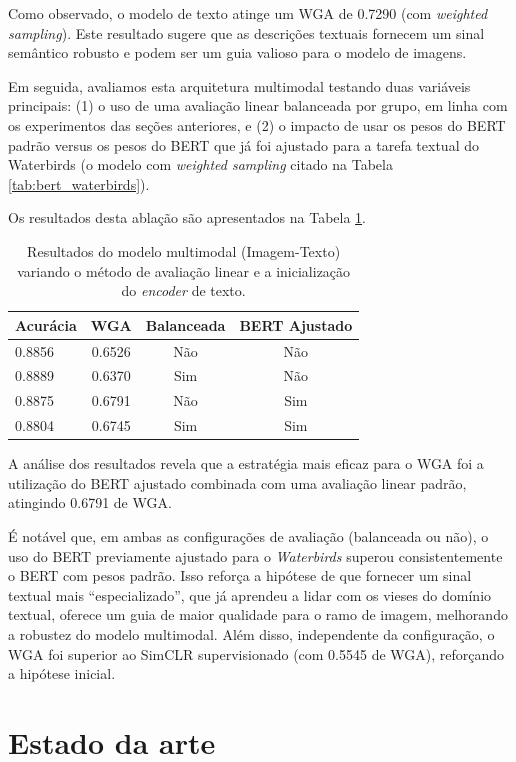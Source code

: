{Como observado, o modelo de texto atinge um WGA de 0.7290 (com \textit{weighted sampling}). Este resultado sugere que as descrições textuais fornecem um sinal semântico robusto e podem ser um guia valioso para o modelo de imagens.

Em seguida, avaliamos esta arquitetura multimodal testando duas variáveis principais: (1) o uso de uma avaliação linear balanceada por grupo, em linha com os experimentos das seções anteriores, e (2) o impacto de usar os pesos do BERT padrão versus os pesos do BERT que já foi ajustado para a tarefa textual do Waterbirds (o modelo com \textit{weighted sampling} citado na Tabela \ref{tab:bert_waterbirds}).

Os resultados desta ablação são apresentados na Tabela \ref{tab:multimodal_results}.

\begin{table}[h]
\centering
\small
\caption{Resultados do modelo multimodal (Imagem-Texto) variando o método de avaliação linear e a inicialização do \textit{encoder} de texto.}
\label{tab:multimodal_results}
\setlength{\tabcolsep}{8pt}
\begin{tabular}{lccc}
\toprule
Acurácia & WGA & Balanceada & BERT Ajustado \\
\midrule
0.8856 & 0.6526 & Não & Não \\
0.8889 & 0.6370 & Sim & Não \\
0.8875 & 0.6791 & Não & Sim \\
0.8804 & 0.6745 & Sim & Sim \\
\bottomrule
\end{tabular}
\end{table}

A análise dos resultados revela que a estratégia mais eficaz para o WGA foi a utilização do BERT ajustado combinada com uma avaliação linear padrão, atingindo 0.6791 de WGA.

É notável que, em ambas as configurações de avaliação (balanceada ou não), o uso do BERT previamente ajustado para o \textit{Waterbirds} superou consistentemente o BERT com pesos padrão. Isso reforça a hipótese de que fornecer um sinal textual mais ``especializado'', que já aprendeu a lidar com os vieses do domínio textual, oferece um guia de maior qualidade para o ramo de imagem, melhorando a robustez do modelo multimodal. Além disso, independente da configuração, o WGA foi superior ao SimCLR supervisionado (com 0.5545 de WGA), reforçando a hipótese inicial.

\section{Estado da arte}

}
